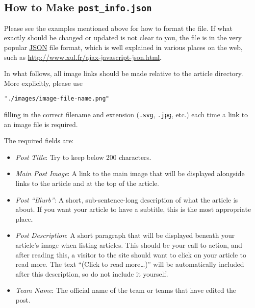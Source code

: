 \documentclass[paper=a4, fontsize=11pt]{scrartcl}
\numberwithin{equation}{section}        %
\numberwithin{figure}{section}            %
\numberwithin{table}{section}                %
\begin{document}
\subsection{How to Make \texttt{\textbf{post\_info.json}}}
Please see the examples mentioned above for how to format the file. If what
exactly should be changed or updated is not clear to you, the file is in the
very popular \href{http://www.xul.fr/ajax-javascript-json.html}{JSON} file
format, which is well explained in various places on the web, such as
\url{http://www.xul.fr/ajax-javascript-json.html}.

In what follows, all image links should be made relative to the article
directory. More explicitly, please use
\begin{verbatim}"./images/image-file-name.png"\end{verbatim}
filling in the correct filename and extension (\texttt{.svg}, \texttt{.jpg},
etc.) each time a link to an image file is required.

\noindent{}The required fields are:\@
\begin{itemize}
    \item \emph{Post Title}: Try to keep below 200 characters.
    \item \emph{Main Post Image}: A link to the main image that will be
        displayed alongside links to the article and at the top of the article.
    \item \emph{Post ``Blurb''}: A short, sub-sentence-long description of what
        the article is about. If you want your article to have a subtitle, this
        is the most appropriate place.
    \item \emph{Post Description}: A short paragraph that will be displayed
        beneath your article's image when listing articles. This should be your
        call to action, and after reading this, a visitor to the site should
        want to click on your article to read more. The text ``(Click to read
        more\ldots{})'' will be automatically included after this description, so do
        not include it yourself.
    \item \emph{Team Name}: The official name of the team or teams that have edited the
        post.
\end{itemize}
\end{document}
